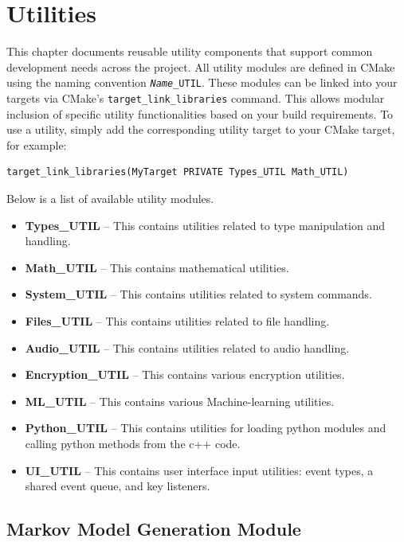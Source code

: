 \chapter{Utilities}
\label{chapter:utilities}

This chapter documents reusable utility components that support common development needs across the project. All utility modules are defined in CMake using the naming convention \texttt{\textit{Name}\_UTIL}. These modules can be linked into your targets via CMake's \texttt{target\_link\_libraries} command. This allows modular inclusion of specific utility functionalities based on your build requirements. To use a utility, simply add the corresponding utility target to your CMake target, for example:
\begin{lstlisting}[style=cppstyle]
target_link_libraries(MyTarget PRIVATE Types_UTIL Math_UTIL)
\end{lstlisting}
Below is a list of available utility modules.
\begin{itemize}\itemsep0em
	\item \textbf{Types\_UTIL} – This contains utilities related to type manipulation and handling.
	\item \textbf{Math\_UTIL} – This contains mathematical utilities.
	\item \textbf{System\_UTIL} – This contains utilities related to system commands.
	\item \textbf{Files\_UTIL} – This contains utilities related to file handling.
	\item \textbf{Audio\_UTIL} – This contains utilities related to audio handling.
	\item \textbf{Encryption\_UTIL} – This contains various encryption utilities.
	\item \textbf{ML\_UTIL} – This contains various Machine-learning utilities.
	\item \textbf{Python\_UTIL} – This contains utilities for loading python modules and calling python methods from the c++ code.
	\item \textbf{UI\_UTIL} – This contains user interface input utilities: event types, a shared event queue, and key listeners.
\end{itemize}









\section{Markov Model Generation Module}

